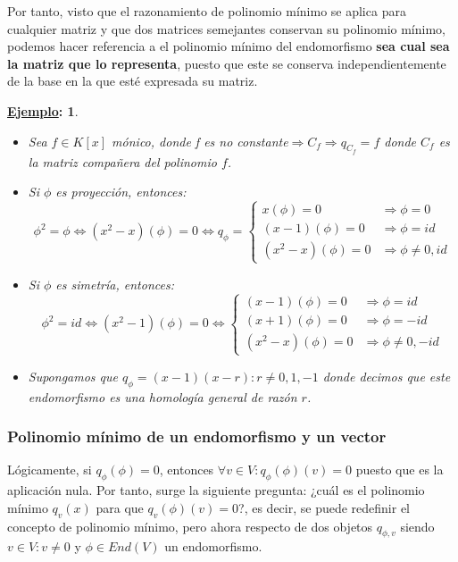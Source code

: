 \documentclass[10pt,a4paper,openright]{book}
\theoremstyle{break}
\newtheorem*{ej}{\underline{Ejemplo}:}
\begin{document}
Por tanto, visto que el razonamiento de polinomio mínimo se aplica para cualquier matriz y que dos matrices semejantes conservan su polinomio mínimo, podemos hacer referencia a el polinomio mínimo del endomorfismo \textbf{sea cual sea la matriz que lo representa}, puesto que este se conserva independientemente de la base en la que esté expresada su matriz.

\begin{ej}
\begin{itemize}
\item Sea $f\in K[x]$ mónico, donde f es no constante$\Rightarrow C_f\Rightarrow q_{C_f}=f$ donde $C_f$ es la matriz compañera del polinomio $f$.

\item Si $\phi$ es proyección, entonces:
$$\phi^2= \phi\Leftrightarrow (x^2-x)(\phi)= 0\Leftrightarrow q_\phi = \begin{cases} x(\phi) = 0 & \Rightarrow \phi = 0 \\ (x-1)(\phi) = 0 & \Rightarrow\phi = id \\ (x^2-x)(\phi) = 0 & \Rightarrow\phi \neq 0,id\end{cases}$$

\item Si $\phi$ es simetría, entonces:
$$\phi^2=id\Leftrightarrow (x^2-1)(\phi)=0\Leftrightarrow \begin{cases} (x-1)(\phi) = 0 & \Rightarrow \phi = id \\ (x+1)(\phi) = 0 & \Rightarrow \phi = -id \\ (x^2-x)(\phi) = 0 & \Rightarrow\phi \neq 0,-id\end{cases}$$

\item Supongamos que $q_\phi = (x-1)(x-r): r\neq 0, 1, -1$ donde decimos que este endomorfismo es una homología general de razón $r$.
\end{itemize}
\end{ej}

\subsubsection{Polinomio mínimo de un endomorfismo y un vector}
Lógicamente, si $q_\phi(\phi) = 0 $, entonces $\forall v\in V : q_\phi(\phi)(v) = 0$ puesto que es la aplicación nula. Por tanto, surge la siguiente pregunta: ¿cuál es el polinomio mínimo $q_v(x)$ para que $q_v(\phi)(v) = 0$?, es decir, se puede redefinir el concepto de polinomio mínimo, pero ahora respecto de dos objetos $q_{\phi, v}$ siendo $v\in V: v\neq 0$ y $\phi\in End(V)$ un endomorfismo.
\end{document}
